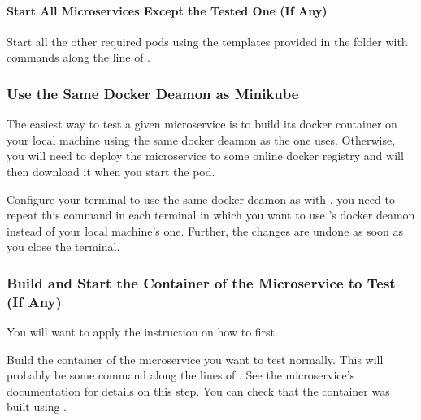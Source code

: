 \documentclass[letterpaper,10pt,english]{sphinxmanual}
\begin{document}
\paragraph{Start All Microservices Except the Tested One (If Any)}
\label{\detokenize{deployments:start-all-microservices-except-the-tested-one-if-any}}
Start all the other required pods using the templates provided in the  folder with commands along the line of .


\subsubsection{Use the Same Docker Deamon as Minikube}
\label{\detokenize{deployments:use-the-same-docker-deamon-as-minikube}}\label{\detokenize{deployments:configure-docker-with-minikube}}
The easiest way to test a given microservice is to build its docker container on your local machine using the same docker deamon as the one  uses.
Otherwise, you will need to deploy the microservice to some online docker registry and  will then download it when you start the pod.

Configure your terminal to use the same docker deamon as  with .
you need to repeat this command in each terminal in which you want to use ’s docker deamon instead of your local machine’s one.
Further, the changes are undone as soon as you close the terminal.


\subsubsection{Build and Start the Container of the Microservice to Test (If Any)}
\label{\detokenize{deployments:build-and-start-the-container-of-the-microservice-to-test-if-any}}
You will want to apply the instruction on how to {\hyperref[\detokenize{deployments:configure-docker-with-minikube}]{}} first.

Build the container of the microservice you want to test normally.
This will probably be some command along the lines of .
See the microservice’s documentation for details on this step.
You can check that the container was built using .
\end{document}
